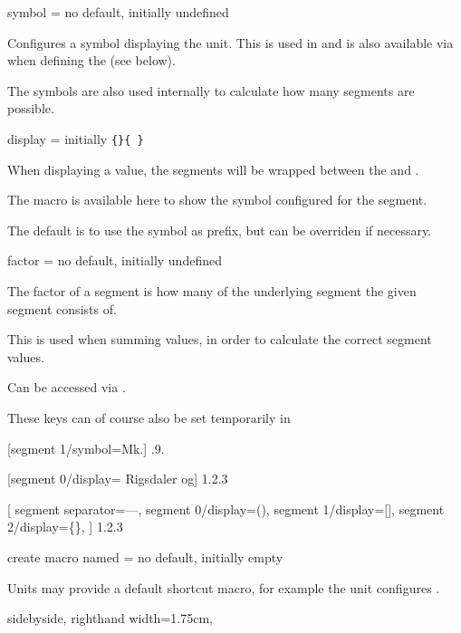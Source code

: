 \documentclass{article}
\begin{document}
\begin{docKey}
	[segment 0]{symbol}
	{=}
	{no default, initially undefined}

	Configures a symbol displaying the unit. This is used in  and is also available via  when defining the  (see below).
	
	The symbols are also used internally to calculate how many segments are possible.
\end{docKey}

\begin{docKey}
	[segment 0]
	{display}
	{=}
	{initially \texttt{\{\}\{ \}}}

	When displaying a value, the segments will be wrapped between the  and .
	
	The macro  is available here to show the symbol configured for the segment.
	
	The default is to use the symbol as prefix, but can be overriden if necessary.
\end{docKey}

\begin{docKey}
	[segment 0]
	{factor}
	{=}
	{no default, initially undefined}
	
	The factor of a segment is how many of the underlying segment the given segment consists of.
	
	This is used when summing values, in order to calculate the correct segment values.
	
	Can be accessed via .
\end{docKey}

These keys can of course also be set temporarily in 

\begin{dispExample}
	[segment 1/symbol=Mk.]
	{.9.}

	[segment 0/display={}{ Rigsdaler og}]
	{1.2.3}

[
		segment separator={---},
		segment 0/display={(}{)},
		segment 1/display={[}{]},
		segment 2/display={\{}{\}},
	]
	{1.2.3}
\end{dispExample}

\begin{docKey}
	{create macro named}
	{=}
	{no default, initially empty}
	
	Units may provide a default shortcut macro, for example the  unit configures .

\begin{dispExample*}{
	sidebyside,
	righthand width=1.75cm,
}
\end{dispExample*}
\end{docKey}
\end{document}
